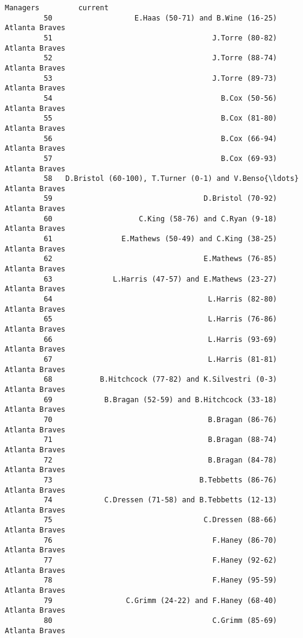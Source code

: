 \documentclass[11pt]{article}
\begin{document}
\begin{Verbatim}[commandchars=\\\{\}]
                                                       Managers         current  
         50                   E.Haas (50-71) and B.Wine (16-25)  Atlanta Braves  
         51                                     J.Torre (80-82)  Atlanta Braves  
         52                                     J.Torre (88-74)  Atlanta Braves  
         53                                     J.Torre (89-73)  Atlanta Braves  
         54                                       B.Cox (50-56)  Atlanta Braves  
         55                                       B.Cox (81-80)  Atlanta Braves  
         56                                       B.Cox (66-94)  Atlanta Braves  
         57                                       B.Cox (69-93)  Atlanta Braves  
         58   D.Bristol (60-100), T.Turner (0-1) and V.Benso{\ldots}  Atlanta Braves  
         59                                   D.Bristol (70-92)  Atlanta Braves  
         60                    C.King (58-76) and C.Ryan (9-18)  Atlanta Braves  
         61                E.Mathews (50-49) and C.King (38-25)  Atlanta Braves  
         62                                   E.Mathews (76-85)  Atlanta Braves  
         63              L.Harris (47-57) and E.Mathews (23-27)  Atlanta Braves  
         64                                    L.Harris (82-80)  Atlanta Braves  
         65                                    L.Harris (76-86)  Atlanta Braves  
         66                                    L.Harris (93-69)  Atlanta Braves  
         67                                    L.Harris (81-81)  Atlanta Braves  
         68           B.Hitchcock (77-82) and K.Silvestri (0-3)  Atlanta Braves  
         69            B.Bragan (52-59) and B.Hitchcock (33-18)  Atlanta Braves  
         70                                    B.Bragan (86-76)  Atlanta Braves  
         71                                    B.Bragan (88-74)  Atlanta Braves  
         72                                    B.Bragan (84-78)  Atlanta Braves  
         73                                  B.Tebbetts (86-76)  Atlanta Braves  
         74            C.Dressen (71-58) and B.Tebbetts (12-13)  Atlanta Braves  
         75                                   C.Dressen (88-66)  Atlanta Braves  
         76                                     F.Haney (86-70)  Atlanta Braves  
         77                                     F.Haney (92-62)  Atlanta Braves  
         78                                     F.Haney (95-59)  Atlanta Braves  
         79                 C.Grimm (24-22) and F.Haney (68-40)  Atlanta Braves  
         80                                     C.Grimm (85-69)  Atlanta Braves  

\end{Verbatim}
\end{document}
